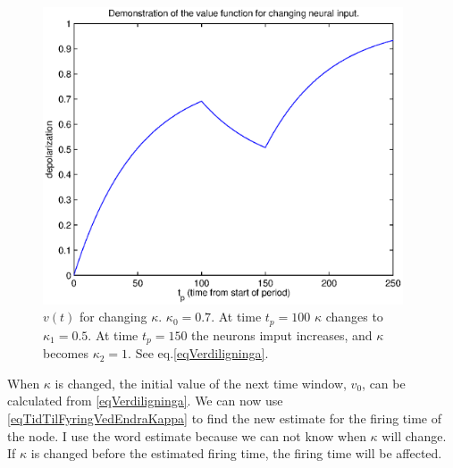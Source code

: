 \begin{figure}[hbt!p]
	\centering
	\includegraphics[width=0.95\textwidth]{demonstrasjonAvUlikeKappaforVerdifunksjonen.eps}
	\caption{$v(t)$ for changing $\kappa$. $\kappa_0=0.7$. At time $t_p=100$ $\kappa$ changes to $\kappa_1=0.5$. At time $t_p=150$ the neurons imput increases, and $\kappa$ becomes $\kappa_2=1$. See eq.\eqref{eqVerdiligninga}.}
	\label{figVerdifunksjonen}
\end{figure}

When $\kappa$ is changed, the initial value of the next time window, $v_0$, can be calculated from \eqref{eqVerdiligninga}. 
We can now use \eqref{eqTidTilFyringVedEndraKappa} to find the new estimate for the firing time of the node.
I use the word estimate because we can not know when $\kappa$ will change.
If $\kappa$ is changed before the estimated firing time, the firing time will be affected. 






%

